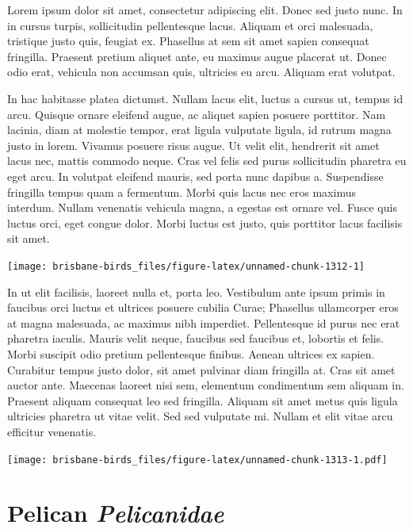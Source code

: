 \documentclass[]{book}
\let\origfigure\figure
\let\endorigfigure\endfigure
\renewenvironment{figure}[1][2] {
  \expandafter\origfigure\expandafter[H]
} {
  \endorigfigure
}
\begin{document}
Lorem ipsum dolor sit amet, consectetur adipiscing elit. Donec sed justo
nunc. In in cursus turpis, sollicitudin pellentesque lacus. Aliquam et
orci malesuada, tristique justo quis, feugiat ex. Phasellus at sem sit
amet sapien consequat fringilla. Praesent pretium aliquet ante, eu
maximus augue placerat ut. Donec odio erat, vehicula non accumsan quis,
ultricies eu arcu. Aliquam erat volutpat.

In hac habitasse platea dictumst. Nullam lacus elit, luctus a cursus ut,
tempus id arcu. Quisque ornare eleifend augue, ac aliquet sapien posuere
porttitor. Nam lacinia, diam at molestie tempor, erat ligula vulputate
ligula, id rutrum magna justo in lorem. Vivamus posuere risus augue. Ut
velit elit, hendrerit sit amet lacus nec, mattis commodo neque. Cras vel
felis sed purus sollicitudin pharetra eu eget arcu. In volutpat eleifend
mauris, sed porta nunc dapibus a. Suspendisse fringilla tempus quam a
fermentum. Morbi quis lacus nec eros maximus interdum. Nullam venenatis
vehicula magna, a egestas est ornare vel. Fusce quis luctus orci, eget
congue dolor. Morbi luctus est justo, quis porttitor lacus facilisis sit
amet.

\begin{figure}
\texttt{[image: brisbane-birds\_files/figure-latex/unnamed-chunk-1312-1]} \caption{insert figure caption}\label{fig:unnamed-chunk-1312}
\end{figure}

In ut elit facilisis, laoreet nulla et, porta leo. Vestibulum ante ipsum
primis in faucibus orci luctus et ultrices posuere cubilia Curae;
Phasellus ullamcorper eros at magna malesuada, ac maximus nibh
imperdiet. Pellentesque id purus nec erat pharetra iaculis. Mauris velit
neque, faucibus sed faucibus et, lobortis et felis. Morbi suscipit odio
pretium pellentesque finibus. Aenean ultrices ex sapien. Curabitur
tempus justo dolor, sit amet pulvinar diam fringilla at. Cras sit amet
auctor ante. Maecenas laoreet nisi sem, elementum condimentum sem
aliquam in. Praesent aliquam consequat leo sed fringilla. Aliquam sit
amet metus quis ligula ultricies pharetra ut vitae velit. Sed sed
vulputate mi. Nullam et elit vitae arcu efficitur venenatis.

\begin{figure}
\centering
\texttt{[image: brisbane-birds\_files/figure-latex/unnamed-chunk-1313-1.pdf]}
\caption{\label{fig:unnamed-chunk-1313}insert figure caption}
\end{figure}

\chapter{\texorpdfstring{Pelican
\emph{Pelicanidae}}{Pelican Pelicanidae}}\label{pelican-pelicanidae}
\end{document}
